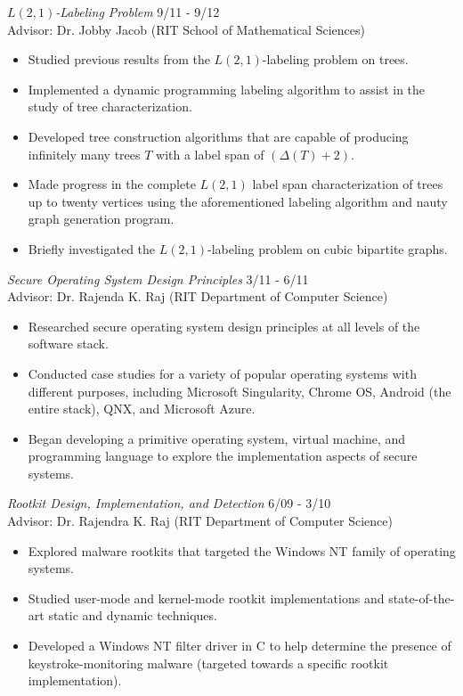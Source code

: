 \documentclass[line,margin]{res}
\begin{document}
\begin{resume}
	{\sl $L(2,1)$-Labeling Problem} \hfill   9/11 - 9/12\\
	 Advisor: Dr. Jobby Jacob (RIT School of Mathematical Sciences)
	\begin{itemize} \itemsep -2pt %
	\item Studied previous results from the $L(2,1)$-labeling problem on trees.
	\item Implemented a dynamic programming labeling algorithm to assist in the study of tree characterization.
	\item Developed tree construction algorithms that are capable of producing infinitely many trees $T$ with a label span of $(\Delta(T) + 2)$.
	\item Made progress in the complete $L(2,1)$ label span characterization of trees up to twenty vertices using the aforementioned labeling algorithm and nauty graph generation program.
	\item Briefly investigated the $L(2,1)$-labeling problem on cubic bipartite graphs.
	\end{itemize}

	{\sl Secure Operating System Design Principles} \hfill    3/11 - 6/11\\
	 Advisor: Dr. Rajenda K. Raj (RIT Department of Computer Science) 
	\begin{itemize} \itemsep -2pt %
	\item Researched secure operating system design principles at all levels of the software stack.
	\item Conducted case studies for a variety of popular operating systems with different purposes, including Microsoft Singularity, Chrome OS, Android (the entire stack), QNX, and Microsoft Azure.
	\item Began developing a primitive operating system, virtual machine, and programming language to explore the implementation aspects of secure systems.
	\end{itemize}

	{\sl Rootkit Design, Implementation, and Detection} \hfill    6/09 - 3/10\\
	 Advisor: Dr. Rajendra K. Raj (RIT Department of Computer Science) 
	\begin{itemize} \itemsep -2pt %
	\item Explored malware rootkits that targeted the Windows NT family of operating systems.
	\item Studied user-mode and kernel-mode rootkit implementations and state-of-the-art static and dynamic techniques.
	\item Developed a Windows NT filter driver in C to help determine the presence of keystroke-monitoring malware (targeted towards a specific rootkit implementation).
	\end{itemize}
 

\end{resume}
\end{document}
